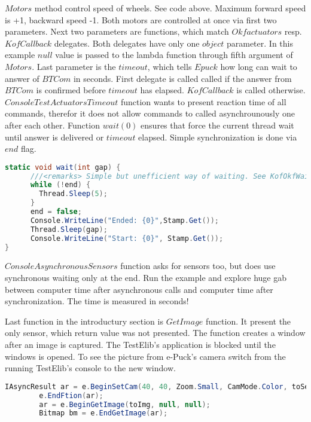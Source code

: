 	$Motors$ method control speed of wheels. See code above. Maximum forward speed is +1, backward speed -1. Both motors are controlled at once via first two parameters.
	Next two parameters are functions, which match $Okfactuators$ resp. $KofCallback$ delegates. Both delegates have only one $object$ parameter. In this example $null$ value is passed
	to the lambda function through fifth argument of $Motors$. Last parameter is the $timeout$, which tells $Epuck$ how long can wait to answer of $BTCom$ in seconds.
	First delegate is called called if the answer from $BTCom$ is confirmed before $timeout$ has elapsed. $KofCallback$ is called otherwise.
	$ConsoleTestActuatorsTimeout$ function wants to present reaction time of all commands, therefor it does not allow commands to called asynchrounously one after each other.
	Function $wait(0)$ ensures that force the current thread wait until answer is delivered or $timeout$ elapsed. Simple synchronization is done via $end$ flag.
\begin{lstlisting}[language=cs]
static void wait(int gap) {
      ///<remarks> Simple but unefficient way of waiting. See KofOkfWaiting(..) in Behaviour for usage of EventWaitHandle.</remarks>
      while (!end) { 
        Thread.Sleep(5); 
      } 
      end = false; 
      Console.WriteLine("Ended: {0}",Stamp.Get());
      Thread.Sleep(gap);
      Console.WriteLine("Start: {0}", Stamp.Get());
}
\end{lstlisting}

	$ConsoleAsynchronousSensors$ function asks for sensors too, but does use synchronous waiting only at the end. Run the example and explore huge gab
	between computer time after asynchronous calls and computer time after synchronization. The time is measured in seconds!
	
	Last function in the introductury section is $GetImage$ function. It present the only sensor, which return value was not presented.
	The function creates a window after an image is captured. The TestElib's application is blocked until the windows is opened. To see the picture from
	e-Puck's camera switch from the running TestElib's console to the new window.


\begin{lstlisting}[language=cs]
	IAsyncResult ar = e.BeginSetCam(40, 40, Zoom.Small, CamMode.Color, toSetCam, null, null);
        e.EndFtion(ar);
        ar = e.BeginGetImage(toImg, null, null);
        Bitmap bm = e.EndGetImage(ar);	
\end{lstlisting}


